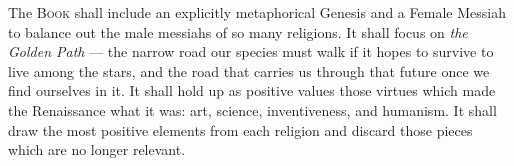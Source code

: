 \vv The \textsc{Book} shall include an explicitly metaphorical Genesis and a Female Messiah to balance out the male messiahs of so many religions.
\vv It shall focus on \textit{the Golden Path} --- the narrow road our species must walk if it hopes to survive to live among the stars, and the road that carries us through that future once we find ourselves in it.
\vv It shall hold up as positive values those virtues which made the Renaissance what it was: art, science, inventiveness, and humanism.
\vv It shall draw the most positive elements from each religion and discard those pieces which are no longer relevant.


%
